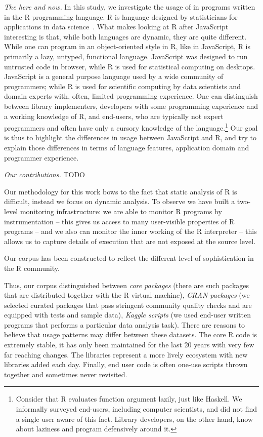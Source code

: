 \documentclass[USenglish,cleveref, autoref, thm-restate]{lipics-v2019}
\begin{document}
\vspace{2mm}\noindent\emph{The here and now.}  In this study, we
investigate the usage of \eval in programs written in the R
programming language. R is language designed by statisticians for
applications in data science~\cite{r}. What makes looking at R after
JavaScript interesting is that, while both languages are dynamic, they
are quite different. While one can program in an object-oriented style
in R, like in JavaScript, R is primarily a lazy, untyped, functional
language.  JavaScript was designed to run untrusted code in browser,
while R is used for statistical computing on desktops. JavaScript is a
general purpose language used by a wide community of programmers;
while R is used for scientific computing by data scientists and domain
experts with, often, limited programming experience. One can
distinguish between library implementers, developers with some
programming experience and a working knowledge of R, and end-users,
who are typically not expert programmers and often have only a cursory
knowledge of the language.\footnote{Consider that R evaluates function
argument lazily, just like Haskell. We informally surveyed end-users,
including computer scientists, and did not find a single user aware of
this fact. Library developers, on the other hand, know about laziness
and program defensively around it.} Our goal is thus to highlight the
differences in usage between JavaScript and R, and try to explain
those differences in terms of language features, application domain
and programmer experience.

\vspace{2mm}\noindent\emph{Our contributions.} 
TODO


Our methodology for this work bows to the fact that static analysis of R is
difficult, instead we focus on dynamic analysis. To observe \eval we have
built a two-level monitoring infrastructure: we are able to monitor R
programs by instrumentation -- this gives us access to many user-visible
properties of R programs -- and we also can monitor the inner working of the
R interpreter -- this allows us to capture details of execution that are not
exposed at the source level.

Our corpus has been constructed to reflect the different level of
sophistication in the R community.

Thus, our
corpus distinguished between \emph{core packages} (there are
\CorpusCorePackages such packages that are distributed together with the R
virtual machine), \emph{CRAN packages} (we selected \CorpusPackages curated
packages that pass stringent community quality checks and are equipped with
tests and sample data), \emph{Kaggle scripts} (we used \CorpusFinishedKaggle
end-user written programs that performs a particular data analysis
task). There are reasons to believe that \eval usage patterns may differ
between these datasets. The core R code is extremely stable, it has only
been maintained for the last 20 years with very few far reaching
changes. The libraries represent a more lively ecosystem with new libraries
added each day.  Finally, end user code is often one-use scripts thrown
together and sometimes never revisited.
\end{document}
